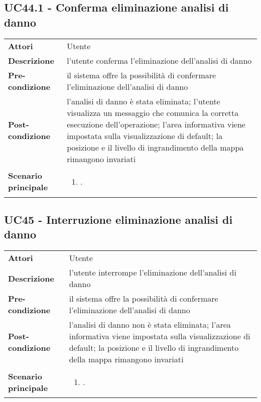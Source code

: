 \subsection{UC44.1 - Conferma eliminazione analisi di danno} 
\label{sssec:UC44.1} 
\def\arraystretch{1.5}
\begin{tabularx}{\textwidth}{l|p{}}
	\rowcolor{I} \multicolumn{2}{c}{\color{white}\textbf{UC44.1 - Conferma eliminazione analisi di danno}} \\
	\toprule
	\endhead
	\textbf{Attori} & Utente\\
	\textbf{Descrizione} & l'utente conferma l'eliminazione dell'analisi di danno\\
	\textbf{Pre-condizione} & il sistema offre la possibilità di confermare l'eliminazione dell'analisi di danno\\
	\textbf{Post-condizione} & l'analisi di danno è stata eliminata; l'utente visualizza un messaggio che comunica la corretta esecuzione dell'operazione;  l'area informativa viene impostata sulla visualizzazione di default;  la posizione e il livello di ingrandimento della mappa rimangono invariati\\
	\textbf{Scenario principale} & \vspace{-1.2em}\begin{enumerate}[leftmargin=*,noitemsep,nosep]
		\item \nameref{sssec:UC44.1}.
	\end{enumerate}\\
	\bottomrule
\end{tabularx}
\subsection{UC45 - Interruzione eliminazione analisi di danno} 
\label{sssec:UC45} 
\def\arraystretch{1.5}
\begin{tabularx}{\textwidth}{l|p{}}
	\rowcolor{I} \multicolumn{2}{c}{\color{white}\textbf{UC45 - Interruzione eliminazione analisi di danno}} \\
	\toprule
	\endhead
	\textbf{Attori} & Utente\\
	\textbf{Descrizione} & l'utente interrompe l'eliminazione dell'analisi di danno\\
	\textbf{Pre-condizione} & il sistema offre la possibilità di confermare l'eliminazione dell'analisi di danno\\
	\textbf{Post-condizione} & l'analisi di danno non è stata eliminata; l'area informativa viene impostata sulla visualizzazione di default; la posizione e il livello di ingrandimento della mappa rimangono invariati\\
	\textbf{Scenario principale} & \vspace{-1.2em}\begin{enumerate}[leftmargin=*,noitemsep,nosep]
		\item \nameref{sssec:UC45}.
	\end{enumerate}\\
	\bottomrule
\end{tabularx}

